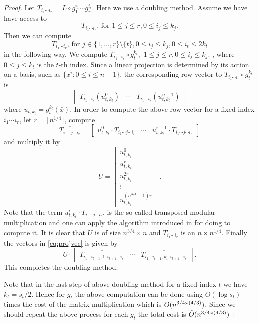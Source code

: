 \begin{proof}
Let $T_{i_1\cdots i_r} = L \circ g_1^{i_1}\cdots g_r^{i_r}$. Here we use a doubling method. Assume we have have access to 
$$T_{i_1\cdots i_r}, \, \mathrm{for}\,\, 1\leq j \leq r, 0 \leq i_j \leq k_j.$$
Then we can compute 
$$T_{i_1\cdots i_r}, \, \mathrm{for}\,\, j \in \lbrace 1, \ldots, r\rbrace \setminus \lbrace t \rbrace, 0 \leq i_j \leq k_j, 0 \leq i_t \leq 2k_t$$
in the following way. We compute 
$T_{i_1 \cdots i_r} \circ g_t^{k_t}, \,\, 1\leq j \leq r, 0 \leq i_j \leq k_j.$
, where $0\leq j \leq k_t$ is the $t$-th index. Since a linear projection is determined by its action on a basis, such as 
$\lbrace\bar{x}^i: 0\leq i \leq n-1 \rbrace$, the corresponding row vector to $T_{i_1 \cdots i_r} \circ g_t^{k_t}$ is 
\begin{equation}\label{eq:projvec}
\begin{bmatrix} T_{i_1 \cdots i_r}(u_{t,k_t}^0) & \cdots & T_{i_1 \cdots i_r}(u_{t,k_t}^{n-1}) \end{bmatrix}
\end{equation}
where $u_{t,k_t} = g_t^{k_t}(\bar{x})$. In order to compute the above row vector for a fixed index $i_1 \cdots i_r$, let $r = \lceil n^{1/4} \rceil$, compute
$$\overline{T_{i_1 \cdots j \cdots i_r}} = \left[\begin{array}{c|c|c}
u_{t,k_t}^0\cdot T_{i_1 \cdots j \cdots i_r} & \cdots & u_{t,k_t}^{r-1}\cdot T_{i_1 \cdots j \cdots i_r}
\end{array} \right]$$
and multiply it by 
$$ U = \left[
\begin{array}{c}
u_{t,k_t}^0\\
\hline
u_{t,k_t}^{r}\\
\hline
u_{t,k_t}^{2r}\\
\hline
\vdots\\
\hline
u_{t,k_t}^{(n^{3/4}-1)r}
\end{array} \right].$$
Note that the term $u_{t,k_t}^i \cdot T_{i_1 \cdots j \cdots i_r}$, is the so called transposed modular multiplication and one can apply the algorithm
 introduced in \cite{Shoup} for doing to compute it. It is clear that $U$ is of size 
$n^{3/4} \times n$ and $\overline{T_{i_1 \cdots i_r}}$ is an $n \times n^{1/4}$. Finally the vectors in \eqref{eq:projvec}
is given by
$$U \cdot \left[\begin{array}{c|c|c}
\overline{T_{i_1 \cdots i_{t-1},1, i_{t+1} \cdots i_r}} & \cdots & \overline{T_{i_1 \cdots i_{t-1},k_t,i_{t+1} \cdots i_r}}
\end{array}\right].
$$
This completes the doubling method.

Note that in the last step of above doubling method for a fixed index $t$ we have $k_t = s_t/2$. Hence for $g_t$ the above computation can be done 
using $O(\log s_t)$ times the cost of the matrix multiplication which is $O(n^{3/4 \omega(4/3)})$. Since we should repeat the above process for each $g_t$ the total cost is
$\tilde{O}(n^{3/4 \omega(4/3)})$ 
\end{proof}

